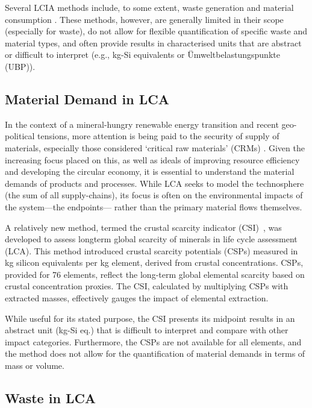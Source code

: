 Several LCIA methods include, to some extent, waste generation \citep{foen2021ecofactors,hauschild2003edip,cen2019en15804} and material consumption \citep{arvidsson2020csi,foen2021ecofactors}. These methods, however, are generally limited in their scope (especially for waste), do not allow for flexible quantification of specific waste and material types, and often provide results in characterised units that are abstract or difficult to interpret (e.g., kg-Si equivalents or Ümweltbelastungspunkte (UBP)).


\subsection{Material Demand in LCA}
In the context of a mineral-hungry renewable energy transition and recent geo-political tensions, more attention is being paid to the security of supply of materials, especially those considered `critical raw materials' (CRMs) \citep{eu2023crmstudy,hool2023crm,mancini2013supplysecurity,jrc2023supplychain,hartley2024cepolitics,salviulo2021supplychain}. Given the increasing focus placed on this, as well as ideals of improving resource efficiency and developing the circular economy, it is essential to understand the material demands of products and processes. While LCA seeks to model the technosphere (the sum of all supply-chains), its focus is often on the environmental impacts of the system---the endpoints--- rather than the primary material flows themselves. 

A relatively new method, termed the crustal scarcity indicator (CSI)~\citep{arvidsson2020csi}, was developed to assess longterm global scarcity of minerals in life cycle assessment (LCA). This method introduced crustal scarcity potentials (CSPs) measured in kg silicon equivalents per kg element, derived from crustal concentrations. CSPs, provided for 76 elements, reflect the long-term global elemental scarcity based on crustal concentration proxies. The CSI, calculated by multiplying CSPs with extracted masses, effectively gauges the impact of elemental extraction. 

While useful for its stated purpose, the CSI presents its midpoint results in an abstract unit (kg-Si eq.) that is difficult to interpret and compare with other impact categories. Furthermore, the CSPs are not available for all elements, and the method does not allow for the quantification of material demands in terms of mass or volume.


\subsection{Waste in LCA}

